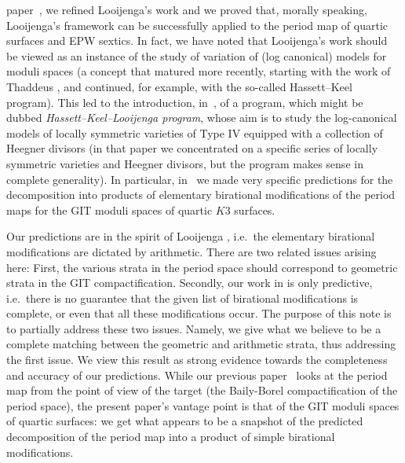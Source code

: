 \documentclass[11pt]{amsart}
\numberwithin{equation}{section}
\theoremstyle{plain}
\theoremstyle{remark}
\theoremstyle{definition}
\begin{document}
paper~\cite{log1}, we refined Looijenga's work and we proved that, morally speaking, Looijenga's framework can be successfully applied to the period map of quartic surfaces and EPW sextics. In fact, we have noted that Looijenga's work should be viewed as an instance of the study of variation of (log canonical) models for moduli spaces (a concept that matured more recently, starting with the work of Thaddeus \cite{thaddeus}, and continued, for example,  with the so-called Hassett--Keel program). This led to the introduction, in~\cite{log1}, of a  program, which might be dubbed  \emph{Hassett--Keel--Looijenga program}, whose aim is to study the log-canonical  models of locally symmetric varieties of Type IV equipped with a collection of Heegner divisors (in that paper we concentrated on a specific series of locally symmetric varieties and Heegner divisors, but the program makes sense in complete generality). In particular,  in~\cite{log1} we made very specific predictions for the decomposition into  products of elementary birational modifications  of the period maps  for the GIT moduli spaces of quartic $K3$ surfaces. 

Our predictions  are in the spirit of Looijenga \cite{looijengacompact}, i.e.~the elementary birational modifications are dictated by arithmetic. There are two related issues arising here: First, the various strata in the period space  should correspond to geometric strata in the GIT compactification. Secondly, our work in \cite{log1} is only predictive, i.e.~there is no guarantee that the given list of birational modifications is complete, or even that all these modifications occur. The purpose of this note is to partially address these two issues. Namely, we give what we believe to be a complete matching between the geometric and arithmetic strata, thus  addressing the first issue. We view this result as strong evidence towards the completeness and accuracy of our predictions.  While our previous paper~\cite{log1} looks at the period map from the point of view of the target (the Baily-Borel compactification of the period space), the present paper's vantage point is that of the GIT moduli spaces of quartic surfaces: we get what appears to be a  snapshot of  the predicted decomposition of the period map into a product of simple birational modifications. 
\end{document}
